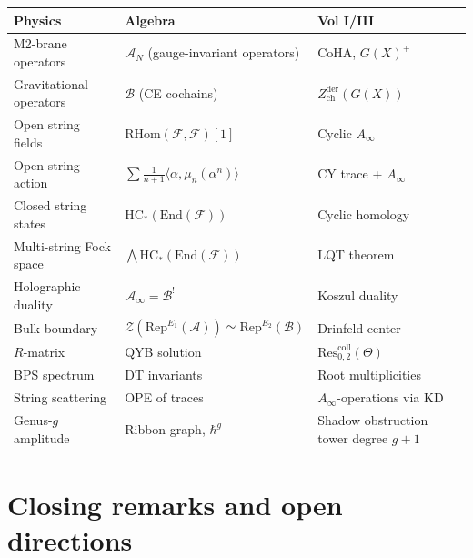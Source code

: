\documentclass[11pt]{article}
\theoremstyle{definition}
\theoremstyle{remark}
\newcommand{\RHom}{\mathrm{RHom}}
\newcommand{\End}{\mathrm{End}}
\newcommand{\HC}{\mathrm{HC}}
\newcommand{\Ainf}{A_\infty}
\newcommand{\Rep}{\mathrm{Rep}}
\newcommand{\cA}{\mathcal{A}}
\newcommand{\cB}{\mathcal{B}}
\newcommand{\cF}{\mathcal{F}}
\newcommand{\cZ}{\mathcal{Z}}
\begin{document}
\begin{center}
\renewcommand{\arraystretch}{1.5}
\begin{tabular}{|l|l|l|}
\hline
\textbf{Physics} & \textbf{Algebra} & \textbf{Vol I/III} \\
\hline
M2-brane operators & $\cA_N$ (gauge-invariant operators) & CoHA, $G(X)^+$ \\
\hline
Gravitational operators & $\cB$ (CE cochains) &
 $Z^{\mathrm{der}}_{\mathrm{ch}}(G(X))$ \\
\hline
Open string fields & $\RHom(\cF, \cF)[1]$ & Cyclic $\Ainf$ \\
\hline
Open string action & $\sum \frac{1}{n+1} \langle \alpha, \mu_n(\alpha^n)
 \rangle$ & CY trace + $\Ainf$ \\
\hline
Closed string states & $\HC_*(\End(\cF))$ & Cyclic homology \\
\hline
Multi-string Fock space & $\bigwedge \HC_*(\End(\cF))$ & LQT theorem \\
\hline
Holographic duality & $\cA_\infty = \cB^!$ & Koszul duality \\
\hline
Bulk-boundary & $\cZ(\Rep^{E_1}(\cA)) \simeq \Rep^{E_2}(\cB)$ &
 Drinfeld center \\
\hline
$R$-matrix & QYB solution & $\mathrm{Res}^{\mathrm{coll}}_{0,2}(\Theta)$ \\
\hline
BPS spectrum & DT invariants & Root multiplicities \\
\hline
String scattering & OPE of traces & $\Ainf$-operations via KD \\
\hline
Genus-$g$ amplitude & Ribbon graph, $\hbar^g$ & Shadow obstruction tower degree $g+1$ \\
\hline
\end{tabular}
\end{center}


\section{Closing remarks and open directions}
\label{sec:open-directions}
\end{document}
